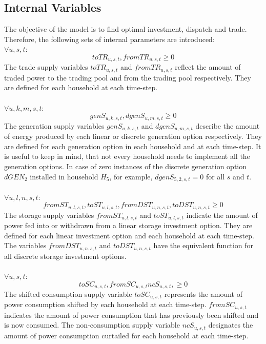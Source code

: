 \documentclass[
	11pt,								%
	DIV10,								%
	a4paper,         					%
	oneside,							%
	headheight=20pt,					%
	footheight=20pt,					%
    parskip=full,						%
    listof=totoc,						%
	bibliography=totoc,					%
	index=totoc,						%
]{scrartcl}
\begin{document}
\subsection{Internal Variables}
The objective of the model is to find optimal investment, dispatch and trade. Therefore, the following sets of internal parameters are introduced:
	\\
	$\forall u,s,t$:
	\begin{equation}
		toTR_{u,s,t}, fromTR_{u,s,t} \geq 0
	\end{equation}
	The trade supply variables $toTR_{u,s,t}$ and $fromTR_{u,s,t}$ reflect the amount of traded power to the trading pool and from the trading pool respectively. They are defined for each household at each time-step.
	\\\\
	$\forall u,k,m,s,t$:
	\begin{equation}
		genS_{u,k,s,t}, dgenS_{u,m,s,t} \geq 0
	\end{equation}
	The generation supply variables $genS_{u,k,s,t}$ and $dgenS_{u,m,s,t}$ describe the amount of energy produced by each linear or discrete generation option respectively. They are defined for each generation option in each household and at each time-step. It is useful to keep in mind, that not every household needs to implement all the generation options. In case of zero instances of the discrete generation option $dGEN_2$ installed in household $H_5$, for example, $dgenS_{5,2,s,t} = 0$ for all $s$ and $t$.
	\\\\
	$\forall u,l,n,s,t$:
	\begin{equation}
	fromST_{u,l,s,t}, toST_{u,l,s,t}, fromDST_{u,n,s,t}, toDST_{u,n,s,t} \geq 0
	\end{equation}
	The storage supply variables $fromST_{u,l,s,t}$ and $toST_{u,l,s,t}$ indicate the amount of power fed into or withdrawn from a linear storage investment option. They are defined for each linear investment option and each household at each time-step. The variables $fromDST_{u,n,s,t}$ and $toDST_{u,n,s,t}$ have the equivalent function for all discrete storage investment options.	
	\\\\
	$\forall u,s,t$:
	\begin{equation}
		toSC_{u,s,t}, fromSC_{u,s,t} ncS_{u,s,t},  \geq 0
	\end{equation}
	The shifted consumption supply variable $toSC_{u,s,t}$ represents the amount of power consumption shifted by each household at each time-step.  $fromSC_{u,s,t}$ indicates the amount of power consumption that has previously been shifted and is now consumed. The non-consumption supply variable $ncS_{u,s,t}$ designates the amount of power consumption curtailed for each household at each time-step.
\end{document}

